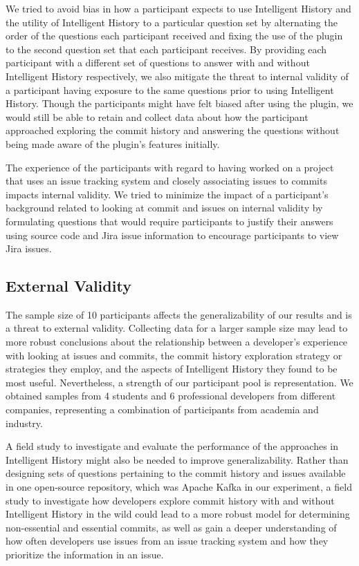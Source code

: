 We tried to avoid bias in how a participant expects to use Intelligent History 
and the utility of Intelligent History to a particular question set 
by alternating the order of the questions each participant received 
and fixing the use of the plugin to the second question set that each participant receives.
By providing each participant with a different set of questions to answer with 
and without Intelligent History respectively,
we also mitigate the threat to internal validity of a participant having 
exposure to the same questions prior to using Intelligent History.
Though the participants might have felt biased after using the plugin,
we would still be able to retain and collect data about how the participant approached 
exploring the commit history and answering the questions without being made aware of the plugin's features initially.

The experience of the participants with regard to having worked on a project that uses an issue tracking system 
and closely associating issues to commits impacts internal validity.
We tried to minimize the impact of a participant's background related 
to looking at commit and issues on internal validity by formulating questions 
that would require participants to justify their answers 
using source code and Jira issue information to encourage participants to view Jira issues.

\subsection{External Validity}

The sample size of 10 participants affects the generalizability of our results and is a threat to external validity.
Collecting data for a larger sample size may lead to more robust conclusions about the relationship 
between a developer's experience with looking at issues and commits,
the commit history exploration strategy or strategies they employ, 
and the aspects of Intelligent History they found to be most useful.
Nevertheless, a strength of our participant pool is representation. 
We obtained samples from 4 students and 6 professional developers from different companies,
representing a combination of participants from academia and industry.

A field study to investigate and evaluate the performance of the approaches in Intelligent History might also be needed to improve generalizability.
Rather than designing sets of questions pertaining to the commit history and issues available in one open-source repository,
which was Apache Kafka in our experiment,
a field study to investigate how developers explore commit history with and without Intelligent History in the wild 
could lead to a more robust model for determining non-essential and essential commits,
as well as gain a deeper understanding of how often developers use issues from an issue tracking system and how they prioritize the information in an issue.

\endinput

Any text after an \endinput is ignored.
You could put scraps here or things in progress.